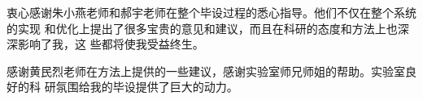 
\begin{ack}
  衷心感谢朱小燕老师和郝宇老师在整个毕设过程的悉心指导。他们不仅在整个系统的实现
  和优化上提出了很多宝贵的意见和建议，而且在科研的态度和方法上也深深影响了我，这
  些都将使我受益终生。

  感谢黄民烈老师在方法上提供的一些建议，感谢实验室师兄师姐的帮助。实验室良好的科
  研氛围给我的毕设提供了巨大的动力。
\end{ack}
